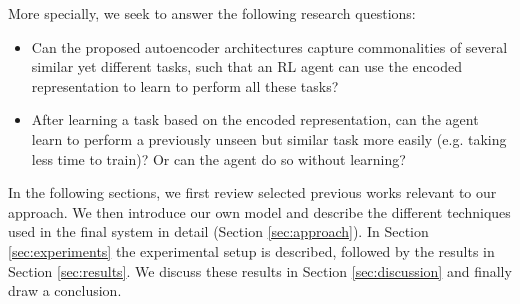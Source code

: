 More specially, we seek to answer the following research questions:
\begin{itemize}
	\item Can the proposed autoencoder architectures capture commonalities of several similar yet different tasks, such that an RL agent can use the encoded representation to learn to perform all these tasks?
	\item After learning a task based on the encoded representation, can the agent learn to perform a previously unseen but similar task more easily (e.g. taking less time to train)? Or can the agent do so without learning?
\end{itemize}

In the following sections, we first review selected previous works relevant to our approach. We then introduce our own model and describe the different techniques used in the final system in detail (Section \ref{sec:approach}). In Section \ref{sec:experiments} the experimental setup is described, followed by the results in Section \ref{sec:results}. We discuss these results in Section \ref{sec:discussion} and finally draw a conclusion.